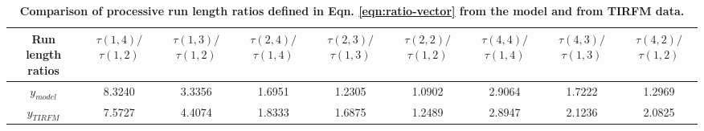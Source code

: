 \begin{table}[!htb]
\centering
\begin{tabulary}{1.0\textwidth}{C C C C C C C C C}
\toprule 
Run length ratios & $\tau(1,4)/$ $\tau(1,2)$ & $\tau(1,3)/$ $\tau(1,2)$ & $\tau(2,4)/$ $\tau(1,4)$ & $\tau(2,3)/$ $\tau(1,3)$ & $\tau(2,2)/$ $\tau(1,2)$ & $\tau(4,4)/$ $\tau(1,4)$ & $\tau(4,3)/$ $\tau(1,3)$ & $\tau(4,2)/$ $\tau(1,2)$ \\
\midrule
$y_{model}$ & 8.3240 & 3.3356 & 1.6951 & 1.2305 & 1.0902 & 2.9064 & 1.7222 & 1.2969 \\
$y_{TIRFM}$ & 7.5727 & 4.4074 & 1.8333 & 1.6875 & 1.2489 & 2.8947 & 2.1236 & 2.0825 \\
\bottomrule
\end{tabulary}
\caption[Comparison of processive run length ratios from the model and TIRFM data.]{\textbf{Comparison of processive run length ratios defined in Eqn. \ref{eqn:ratio-vector} from the model and from TIRFM data.}}
\label{tab:model-ratios}
\end{table}